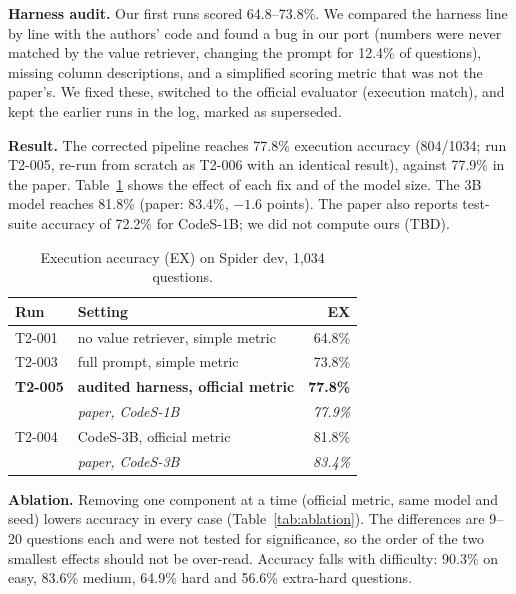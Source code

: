 \documentclass[conference]{IEEEtran}
\begin{document}
\textbf{Harness audit.} Our first runs scored 64.8--73.8\%. We compared the harness line by line with the authors' code and found a bug in our port (numbers were never matched by the value retriever, changing the prompt for 12.4\% of questions), missing column descriptions, and a simplified scoring metric that was not the paper's. We fixed these, switched to the official evaluator \cite{zhong2020semantic} (execution match), and kept the earlier runs in the log, marked as superseded.

\textbf{Result.} The corrected pipeline reaches 77.8\% execution accuracy (804/1034; run T2-005, re-run from scratch as T2-006 with an identical result), against 77.9\% in the paper. Table~\ref{tab:repro} shows the effect of each fix and of the model size. The 3B model reaches 81.8\% (paper: 83.4\%, $-1.6$ points). The paper also reports test-suite accuracy of 72.2\% for CodeS-1B; we did not compute ours (TBD).

\begin{table}[t]
\centering
\caption{Execution accuracy (EX) on Spider dev, 1,034 questions.}
\label{tab:repro}
\small
\begin{tabular}{@{}llr@{}}
\toprule
Run & Setting & EX \\
\midrule
T2-001 & no value retriever, simple metric & 64.8\% \\
T2-003 & full prompt, simple metric & 73.8\% \\
\textbf{T2-005} & \textbf{audited harness, official metric} & \textbf{77.8\%} \\
 & \emph{paper, CodeS-1B} & \emph{77.9\%} \\
T2-004 & CodeS-3B, official metric & 81.8\% \\
 & \emph{paper, CodeS-3B} & \emph{83.4\%} \\
\bottomrule
\end{tabular}
\end{table}

\textbf{Ablation.} Removing one component at a time (official metric, same model and seed) lowers accuracy in every case (Table~\ref{tab:ablation}). The differences are 9--20 questions each and were not tested for significance, so the order of the two smallest effects should not be over-read. Accuracy falls with difficulty: 90.3\% on easy, 83.6\% medium, 64.9\% hard and 56.6\% extra-hard questions.
\end{document}
